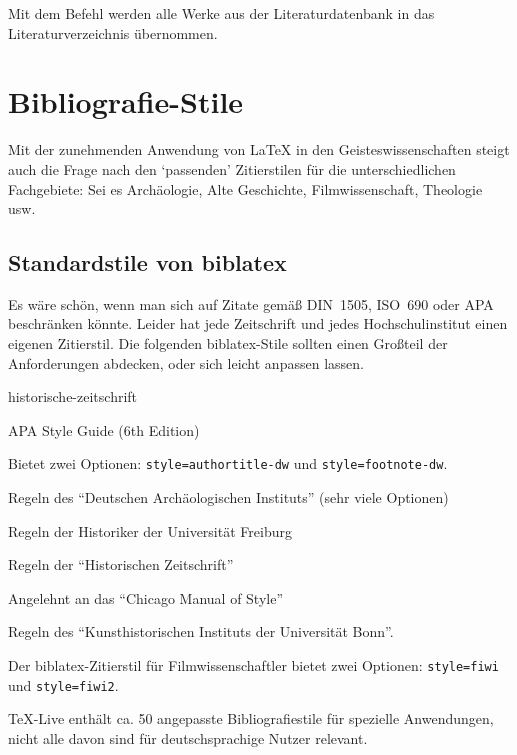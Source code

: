 Mit dem Befehl \marg{*} werden alle Werke aus der
Literaturdatenbank in das Literaturverzeichnis übernommen.


\section{Bibliografie-Stile}\label{sec:bibliografiestile}
Mit der zunehmenden Anwendung von \LaTeX{} in den Geisteswissenschaften steigt auch die Frage nach den \enquote*{passenden} Zitierstilen für die unterschiedlichen Fachgebiete:
Sei es Archäologie, Alte Geschichte, Filmwissenschaft, Theologie usw.
\subsection{Standardstile von biblatex}

Es wäre schön, wenn man sich auf Zitate gemäß DIN~1505, ISO~690 oder APA beschränken könnte.
Leider hat jede Zeitschrift und jedes Hochschulinstitut einen eigenen Zitierstil.
Die folgenden biblatex-Stile sollten einen Großteil der Anforderungen abdecken, oder sich leicht anpassen lassen.

\begin{labeling}{historische-zeitschrift}
  \item[biblatex-apa]       APA Style Guide (6th Edition)
  \item[biblatex-dw]        Bietet zwei Optionen: \lstinline/style=authortitle-dw/ und \lstinline/style=footnote-dw/.
  \item[biblatex-archaeology] Regeln des \enquote{Deutschen Archäologischen Instituts} (sehr viele Optionen)
  \item[geschichtsfrkl]     Regeln der Historiker der Universität Freiburg
  \item[historische-zeitschrift] Regeln der \enquote{Historischen
    Zeitschrift}
  \item[biblatex-historian] Angelehnt an das \enquote{Chicago Manual of Style}
  \item[biblatex-arthistory-bonn] Regeln des \enquote{Kunsthistorischen Instituts der Universität Bonn}.
  \item[biblatex-fiwi]      Der biblatex-Zitierstil für Filmwissenschaftler bietet zwei Optionen: \lstinline/style=fiwi/ und \lstinline/style=fiwi2/.
\end{labeling}


TeX-Live enthält ca. 50 angepasste Bibliografiestile für spezielle Anwendungen, 
nicht alle davon sind für deutschsprachige Nutzer relevant.


